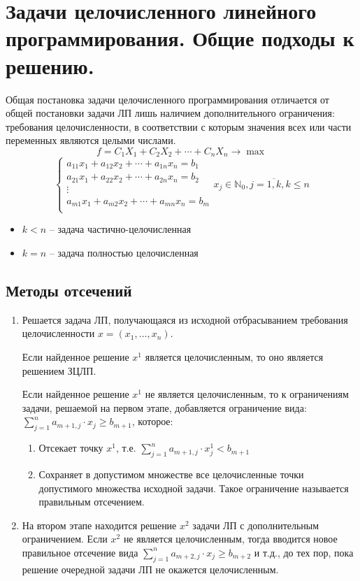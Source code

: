 \documentclass[17pt]{extarticle}
\begin{document}
\section{Задачи целочисленного линейного программирования. Общие подходы к решению.}
Общая постановка задачи целочисленного
программирования отличается от общей
постановки задачи ЛП лишь наличием
дополнительного ограничения: требования
целочисленности, в соответствии с которым
значения всех или части переменных
являются целыми числами.
\[
    f = C_1 X_1 + C_2 X_2 + \cdots + C_n X_n \rightarrow \max
\]
\[
    \begin{cases}
        a_{11}x_1 + a_{12}x_2 + \cdots + a_{1n}x_n = b_1 \\
        a_{21}x_1 + a_{22}x_2 + \cdots + a_{2n}x_n = b_2 \\
        \vdots                                           \\
        a_{m1}x_1 + a_{m2}x_2 + \cdots + a_{mn}x_n = b_m \\
    \end{cases} x_j \in \mathbb{N}_0, j=\overline{1,k}, k \leq n
\]
\begin{itemize}
    \item $k<n$ -- задача частично-целочисленная
    \item $k=n$ -- задача полностью целочисленная
\end{itemize}

\subsection{Методы отсечений}
\begin{enumerate}
    \item Решается задача ЛП, получающаяся из исходной отбрасыванием требования целочисленности \( x = (x_1, \ldots, x_n) \).

          Если найденное решение \( x^1 \) является целочисленным, то оно является решением ЗЦЛП.

          Если найденное решение \( x^1 \) не является целочисленным, то к ограничениям задачи, решаемой на первом этапе, добавляется ограничение вида:
          \(
          \sum_{j=1}^n a_{m+1,j} \cdot x_j \geq b_{m+1}
          \), которое:

          \begin{enumerate}
              \item Отсекает точку \( x^1 \), т.е. \(\sum_{j=1}^n a_{m+1,j} \cdot x_j^1 < b_{m+1}\)
              \item Сохраняет в допустимом множестве все целочисленные точки допустимого множества исходной задачи.
                    Такое ограничение называется правильным отсечением.
          \end{enumerate}

    \item На втором этапе находится решение \( x^2 \) задачи ЛП с дополнительным ограничением.
          Если \( x^2 \) не является целочисленным,
          тогда вводится новое правильное отсечение вида \(\sum_{j=1}^n a_{m+2,j} \cdot x_j \geq b_{m+2}\)
          и т.д., до тех пор, пока решение очередной задачи ЛП не окажется целочисленным.
\end{enumerate}
\end{document}
